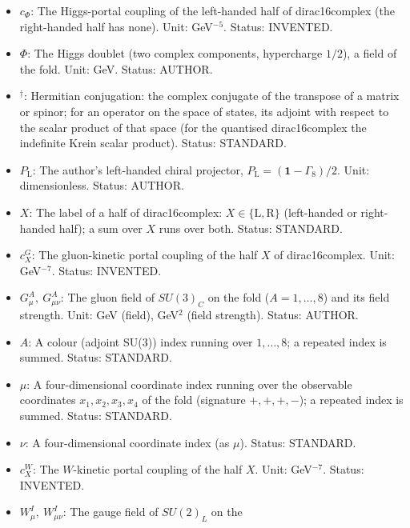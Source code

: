 \documentclass[
  10pt,
]{article}
\begin{document}
\begin{itemize}
  \(16 \times 16\) matrix (with a derivative along the fold) built from
  the Standard-Model fields at the fold by varying the portals with
  respect to \(\bar\Psi\) (FE-13). Unit: GeV\(^{-3}\) (so that
  \(\mathbb{M}/V_*\) is dimensionless). Status: DERIVED.
\item
  \(c_\Phi\): The Higgs-portal coupling of the left-handed half of
  dirac16complex (the right-handed half has none). Unit: GeV\(^{-5}\).
  Status: INVENTED.
\item
  \(\Phi\): The Higgs doublet (two complex components, hypercharge
  \(1/2\)), a field of the fold. Unit: GeV. Status: AUTHOR.
\item
  \({}^\dagger\): Hermitian conjugation: the complex conjugate of the
  transpose of a matrix or spinor; for an operator on the space of
  states, its adjoint with respect to the scalar product of that space
  (for the quantised dirac16complex the indefinite Krein scalar
  product). Status: STANDARD.
\item
  \(P_{\mathrm{L}}\): The author's left-handed chiral projector,
  \(P_{\mathrm{L}} = (\mathbf{1} - \Gamma_8)/2\). Unit: dimensionless.
  Status: AUTHOR.
\item
  \(X\): The label of a half of dirac16complex:
  \(X \in \{\mathrm{L}, \mathrm{R}\}\) (left-handed or right-handed
  half); a sum over \(X\) runs over both. Status: STANDARD.
\item
  \(c^{G}_X\): The gluon-kinetic portal coupling of the half \(X\) of
  dirac16complex. Unit: GeV\(^{-7}\). Status: INVENTED.
\item
  \(G^A_\mu,\ G^A_{\mu\nu}\): The gluon field of \(SU(3)_C\) on the fold
  (\(A = 1, \dots, 8\)) and its field strength. Unit: GeV (field),
  GeV\(^2\) (field strength). Status: AUTHOR.
\item
  \(A\): A colour (adjoint SU(3)) index running over \(1, \dots, 8\); a
  repeated index is summed. Status: STANDARD.
\item
  \(\mu\): A four-dimensional coordinate index running over the
  observable coordinates \(x_1, x_2, x_3, x_4\) of the fold (signature
  \(+,+,+,-\)); a repeated index is summed. Status: STANDARD.
\item
  \(\nu\): A four-dimensional coordinate index (as \(\mu\)). Status:
  STANDARD.
\item
  \(c^{W}_X\): The \(W\)-kinetic portal coupling of the half \(X\).
  Unit: GeV\(^{-7}\). Status: INVENTED.
\item
  \(W^I_\mu,\ W^I_{\mu\nu}\): The gauge field of \(SU(2)_L\) on the

\end{itemize}
\end{document}
